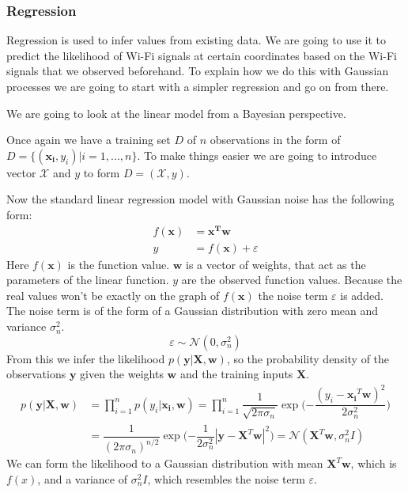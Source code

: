 \subsubsection{Regression}
Regression is used to infer values from existing data. We are going to use it to predict the likelihood of Wi-Fi signals at certain coordinates based on the Wi-Fi signals that we observed beforehand. To explain how we do this with Gaussian processes we are going to start with a simpler regression and go on from there. 

We are going to look at the linear model from a Bayesian perspective. 

Once again we have a training set $D$ of $n$ observations in the form of $D = \{(\mathbf{x_i},y_i)|i=1,...,n\}$. To make things easier we are going to introduce vector $\mathcal{X}$ and $y$ to form $D = (\mathcal{X},y)$.

Now the standard linear regression model with Gaussian noise has the following form:
\begin{equation}\label{linearmodel}
\begin{aligned}
f(\mathbf{x}) &= \mathbf{x^T}\mathbf{w}\\
y &= f(\mathbf{x}) + \varepsilon
\end{aligned}
\end{equation}
Here $f(\mathbf{x})$ is the function value. $\mathbf{w}$ is a vector of weights, that act as the parameters of the linear function. $y$ are the observed function values. Because the real values won't be exactly on the graph of $f(\mathbf{x})$ the noise term $\varepsilon$ is added. \cite[p. 8]{Rasmussen:2005:GPM:1162254} The noise term is of the form of a Gaussian distribution with zero mean and variance $\sigma_n^2$.
\begin{equation}\label{noise_term}
\varepsilon \sim \mathcal{N}(0,\sigma_n^2)
\end{equation}
From this we infer the likelihood $p(\mathbf{y}|\mathbf{X},\mathbf{w})$, so the probability density of the observations $\mathbf{y}$ given the weights $\mathbf{w}$ and the training inputs $\mathbf{X}$. \\\cite[p. 9]{Rasmussen:2005:GPM:1162254}
\begin{equation}\label{eq:likelihood}
\begin{aligned}
p(\mathbf{y}|\mathbf{X},\mathbf{w}) &= \prod_{i=1}^{n}p(y_i|\mathbf{x_i},\mathbf{w}) = \prod_{i=1}^{n}\dfrac{1}{\sqrt{2\pi\sigma_n}}\exp\big({-\dfrac{(y_i-\mathbf{x_i}^T\mathbf{w})^2}{2\sigma_n^2}}\big)\\
& = \dfrac{1}{(2\pi\sigma_n)^{n/2}}\exp\big({-\dfrac{1}{2\sigma_n^2}|\mathbf{y}-\mathbf{X}^T\mathbf{w}|^2}\big) = \mathcal{N}(\mathbf{X}^T\mathbf{w},\sigma_n^2I)
\end{aligned}
\end{equation}
We can form the likelihood to a Gaussian distribution with mean $\mathbf{X}^T\mathbf{w}$, which is $f(x)$, and a variance of $\sigma_n^2I$, which resembles the noise term $\varepsilon$.

